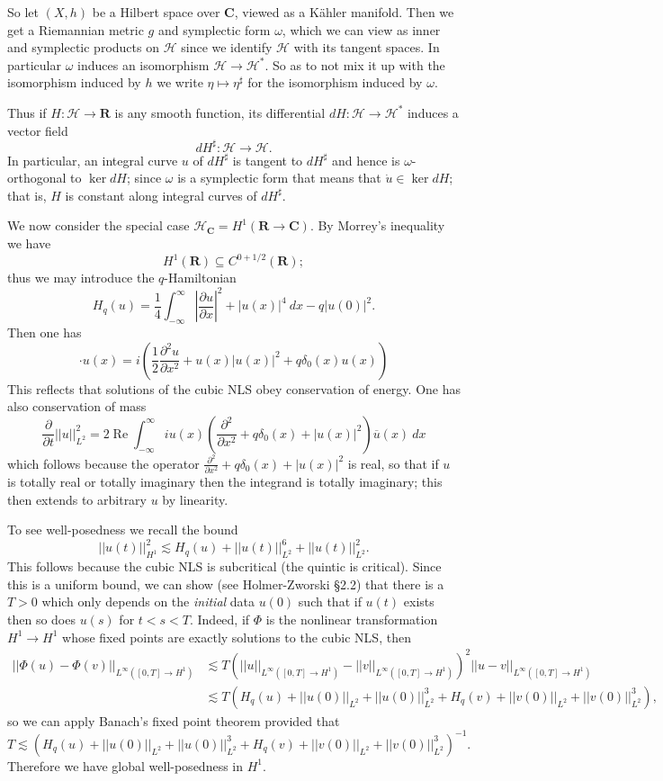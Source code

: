 \documentclass[reqno,12pt,letterpaper]{amsart}
\newcommand{\RR}{\mathbf{R}}
\newcommand{\CC}{\mathbf{C}}
\renewcommand{\Re}{\operatorname{Re}}
\theoremstyle{definition}
\begin{document}
So let $(X, h)$ be a Hilbert space over $\CC$, viewed as a K\"ahler manifold.
Then we get a Riemannian metric $g$ and symplectic form $\omega$, which we can view as inner and symplectic products on $\mathcal H$ since we identify $\mathcal H$ with its tangent spaces. In particular $\omega$ induces an isomorphism $\mathcal H \to \mathcal H^*$.
So as to not mix it up with the isomorphism induced by $h$ we write $\eta \mapsto \eta^\sharp$ for the isomorphism induced by $\omega$.

Thus if $H: \mathcal H \to \RR$ is any smooth function, its differential $dH: \mathcal H \to \mathcal H^*$ induces a vector field
$$dH^\sharp: \mathcal H \to \mathcal H.$$
In particular, an integral curve $u$ of $dH^\sharp$ is tangent to $dH^\sharp$ and hence is $\omega$-orthogonal to $\ker dH$; since $\omega$ is a symplectic form that means that $\dot u \in \ker dH$; that is, $H$ is constant along integral curves of $dH^\sharp$.

We now consider the special case $\mathcal H_\CC = H^1(\RR \to \CC)$. By Morrey's inequality we have
$$H^1(\RR) \subseteq C^{0+1/2}(\RR);$$
thus we may introduce the $q$-Hamiltonian
$$H_q(u) = \frac{1}{4} \int_{-\infty}^\infty \left|\frac{\partial u}{\partial x}\right|^2 + |u(x)|^4 ~dx - q|u(0)|^2.$$
Then one has
$$\cdot u(x) = i\left(\frac{1}{2} \frac{\partial^2 u}{\partial x^2} + u(x)|u(x)|^2 + q\delta_0(x)u(x)\right)$$
This reflects that solutions of the cubic NLS obey conservation of energy.
One has also conservation of mass
$$\frac{\partial}{\partial t} ||u||_{L^2}^2 = 2 \Re \int_{-\infty}^\infty iu(x) \left(\frac{\partial^2}{\partial x^2} + q\delta_0(x) + |u(x)|^2\right)\overline u(x) ~dx$$
which follows because the operator $\frac{\partial^2}{\partial x^2} + q\delta_0(x) + |u(x)|^2$ is real, so that if $u$ is totally real or totally imaginary then the integrand is totally imaginary; this then extends to arbitrary $u$ by linearity.

To see well-posedness we recall the bound
$$||u(t)||_{H^1}^2 \lesssim H_q(u) + ||u(t)||_{L^2}^6 + ||u(t)||_{L^2}^2.$$
This follows because the cubic NLS is subcritical (the quintic is critical).
Since this is a uniform bound, we can show (see Holmer-Zworski \S2.2) that there is a $T > 0$ which only depends on the \emph{initial} data $u(0)$ such that if $u(t)$ exists then so does $u(s)$ for $t < s < T$.
Indeed, if $\Phi$ is the nonlinear transformation $H^1 \to H^1$ whose fixed points are exactly solutions to the cubic NLS, then
\begin{align*}
||\Phi(u) - \Phi(v)||_{L^\infty([0, T] \to H^1)} &\lesssim T(||u||_{L^\infty([0, T] \to H^1)} - ||v||_{L^\infty([0, T] \to H^1)})^2 ||u - v||_{L^\infty([0, T] \to H^1)} \\
&\lesssim T(H_q(u) + ||u(0)||_{L^2} + ||u(0)||_{L^2}^3 + H_q(v) + ||v(0)||_{L^2} + ||v(0)||_{L^2}^3),
\end{align*}
so we can apply Banach's fixed point theorem provided that
$$T \lesssim (H_q(u) + ||u(0)||_{L^2} + ||u(0)||_{L^2}^3 + H_q(v) + ||v(0)||_{L^2} + ||v(0)||_{L^2}^3)^{-1}.$$
Therefore we have global well-posedness in $H^1$.
\end{document}
